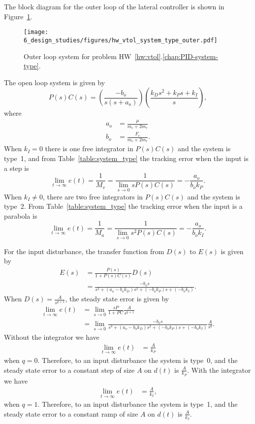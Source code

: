 The block diagram for the outer loop of the lateral controller is shown in Figure~\ref{fig:hw_vtol_system_type_outer}.
\begin{figure}[H]
   \centering
   \texttt{[image: 6\_design\_studies/figures/hw\_vtol\_system\_type\_outer.pdf]}
   \caption{Outer loop system for problem HW~\ref{hw:vtol}.\ref{chap:PID-system-type}.}
   \label{fig:hw_vtol_system_type_outer}
\end{figure}
The open loop system is given by
\[
P(s)C(s) = \left(\frac{-b_o}{s(s+a_o)}\right)\left(\frac{k_Ds^2+k_Ps+k_I}{s}\right),
\]
where
\begin{align*}
a_o &= \frac{\mu}{m_c+2m_r} \\
b_o &= \frac{F_e}{m_c+2m_r}.
\end{align*}
When $k_I=0$ there is one free integrator in $P(s)C(s)$ and the system is type~1, and from Table~\ref{table:system_type} the tracking error when the input is a step is 
\[
\lim_{t\to\infty}e(t) = \frac{1}{M_v} = \frac{1}{\lim_{s\to 0} sP(s)C(s)} = -\frac{a_o}{b_ok_P}.
\]
When $k_I\neq 0$, there are two free integrators in $P(s)C(s)$ and the system is type~2.  From Table~\ref{table:system_type} the tracking error when the input is a parabola is 
\[
\lim_{t\to\infty}e(t) = \frac{1}{M_a} = \frac{1}{\lim_{s\to 0} s^2P(s)C(s)} = -\frac{a_o}{b_ok_I}.
\]

For the input disturbance, the transfer function from $D(s)$ to $E(s)$ is given by
\begin{align*}
E(s) &= \frac{P(s)}{1+P(s)C(s)}D(s) \\
     &= \frac{-b_os}{s^3+(a_o-b_ok_D)s^2+(-b_ok_P)s+(-b_ok_I)}.
\end{align*}
When $D(s)= \frac{A}{s^{q+1}}$, the steady state error is given by
\begin{align*}
\lim_{t\to\infty} e(t) &= \lim_{s\to 0} \frac{sP}{1+PC}\frac{A}{s^{q+1}} \\
&= \lim_{s\to 0} \frac{-b_os}{s^3+(a_o-b_ok_D)s^2+(-b_ok_P)s+(-b_ok_I)}\frac{A}{s^q}.
\end{align*}
Without the integrator we have
\begin{align*}
\lim_{t\to\infty} e(t) &= \frac{A}{k_P}
\end{align*}
when $q=0$. Therefore, to an input disturbance the system is type~0, and the steady state error to a constant step of size $A$ on $d(t)$ is $\frac{A}{k_P}$. With the integrator we have
\begin{align*}
\lim_{t\to\infty} e(t) &= \frac{A}{k_I},
\end{align*}
when $q=1$. Therefore, to an input disturbance the system is type~1, and the steady state error to a constant ramp of size $A$ on $d(t)$ is $\frac{A}{k_I}$.


